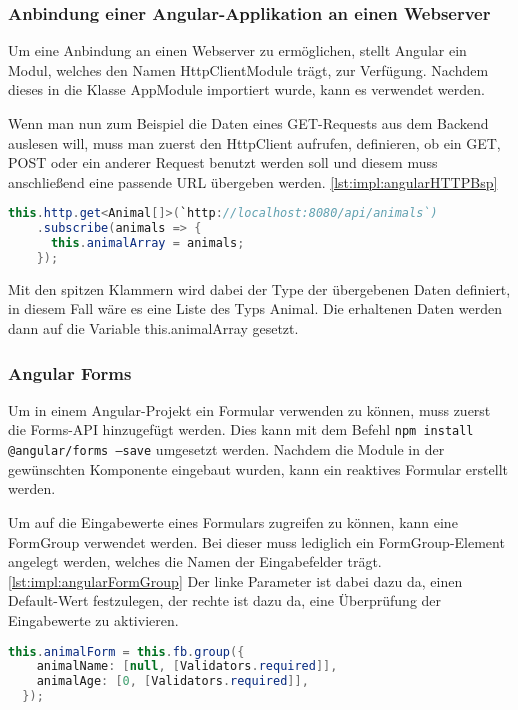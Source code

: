 \subsubsection{Anbindung einer Angular-Applikation an einen Webserver}
Um eine Anbindung an einen Webserver zu ermöglichen, stellt Angular ein Modul, welches den Namen HttpClientModule trägt, zur Verfügung. Nachdem dieses in die Klasse AppModule importiert wurde, kann es verwendet werden.
 
Wenn man nun zum Beispiel die Daten eines GET-Requests aus dem Backend auslesen will, muss man zuerst den HttpClient aufrufen, definieren, ob ein GET, POST oder ein anderer Request benutzt werden soll und diesem muss anschließend eine passende URL übergeben werden. \ref{lst:impl:angularHTTPBsp}
 
\begin{lstlisting}[language=java,caption=Beispiel für einen GET-Request,label=lst:impl:angularHTTPBsp]
  this.http.get<Animal[]>(`http://localhost:8080/api/animals`)
    .subscribe(animals => {
      this.animalArray = animals;
    });
\end{lstlisting}
 
Mit den spitzen Klammern wird dabei der Type der übergebenen Daten definiert, in diesem Fall wäre es eine Liste des Typs Animal. Die erhaltenen Daten werden dann auf die Variable this.animalArray gesetzt.
 
\subsubsection{Angular Forms}
Um in einem Angular-Projekt ein Formular verwenden zu können, muss zuerst die Forms-API hinzugefügt werden. Dies kann mit dem Befehl \texttt{npm install @angular/forms --save} umgesetzt werden. Nachdem die Module in der gewünschten Komponente eingebaut wurden, kann ein reaktives Formular erstellt werden.
 
Um auf die Eingabewerte eines Formulars zugreifen zu können, kann eine FormGroup verwendet werden. Bei dieser muss lediglich ein FormGroup-Element angelegt werden, welches die Namen der Eingabefelder trägt. \ref{lst:impl:angularFormGroup} Der linke Parameter ist dabei dazu da, einen Default-Wert festzulegen, der rechte ist dazu da, eine Überprüfung der Eingabewerte zu aktivieren.
 
\begin{lstlisting}[language=java,caption=Beispiel für FormGroup eines Angular Formulars,label=lst:impl:angularFormGroup]
  this.animalForm = this.fb.group({
    animalName: [null, [Validators.required]],
    animalAge: [0, [Validators.required]],
  });
\end{lstlisting}
 
